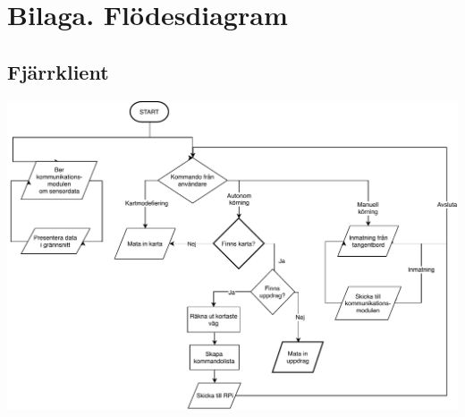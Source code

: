 \documentclass[main.tex]{subfiles}
\begin{document}
\appendix

\pagestyle{empty}
\recalctypearea

\vspace*{-10mm}
\section{Bilaga. Flödesdiagram}
\subsection{Fjärrklient}
\label{flow:remote}
\begin{minipage}{\textwidth}
    \includegraphics[scale=0.91]{designspec/diagrams/flowcharts/remote.pdf}
\end{minipage}

\recalctypearea
\end{document}
